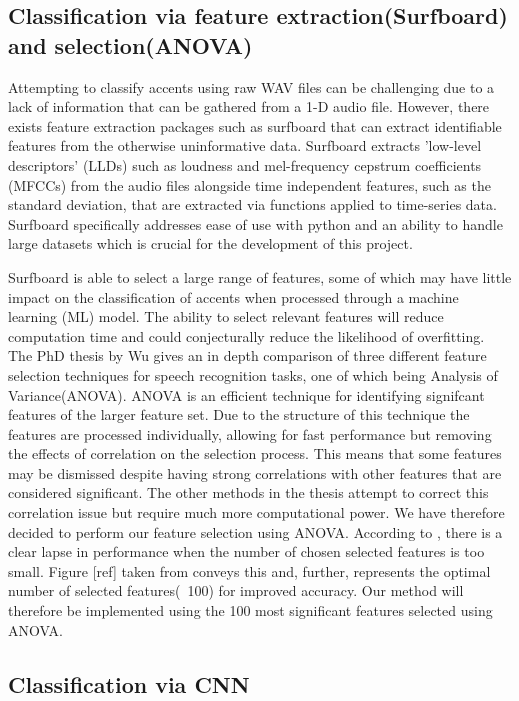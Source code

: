\documentclass[11pt,a4paper,twoside]{article}
\begin{document}
\subsection{Classification via feature extraction(Surfboard) and selection(ANOVA)}

Attempting to classify accents using raw WAV files can be challenging due to a lack of information that can be gathered from a 1-D audio file. However, there exists feature extraction packages such as surfboard\cite{surfboard} that can extract identifiable features from the otherwise uninformative data. Surfboard extracts 'low-level descriptors' (LLDs) such as loudness and mel-frequency cepstrum coefficients (MFCCs) from the audio files alongside time independent features, such as the standard deviation, that are extracted via functions applied to time-series data\cite{surfboard}. Surfboard specifically addresses ease of use with python and an ability to handle large datasets which is crucial for the development of this project.

Surfboard is able to select a large range of features, some of which may have little impact on the classification of accents when processed through a machine learning (ML) model. The ability to select relevant features will reduce computation time and could conjecturally reduce the likelihood of overfitting. The PhD thesis by Wu\cite{featselectionWU} gives an in depth comparison of three different feature selection techniques for speech recognition tasks, one of which being Analysis of Variance(ANOVA). ANOVA is an efficient technique for identifying signifcant features of the larger feature set. Due to the structure of this technique the features are processed individually, allowing for fast performance but removing the effects of correlation on the selection process. This means that some features may be dismissed despite having strong correlations with other features that are considered significant. The other methods in the thesis attempt to correct this correlation issue but require much more computational power. We have therefore decided to perform our feature selection using ANOVA. According to \cite{featselectionWU}, there is a clear lapse in performance when the number of chosen selected features is too small. Figure [ref] taken from \cite{featselectionWU} conveys this and, further, represents the optimal number of selected features(~100) for improved accuracy. Our method will therefore be implemented using the 100 most significant features selected using ANOVA.

\subsection{Classification via CNN}
\end{document}
